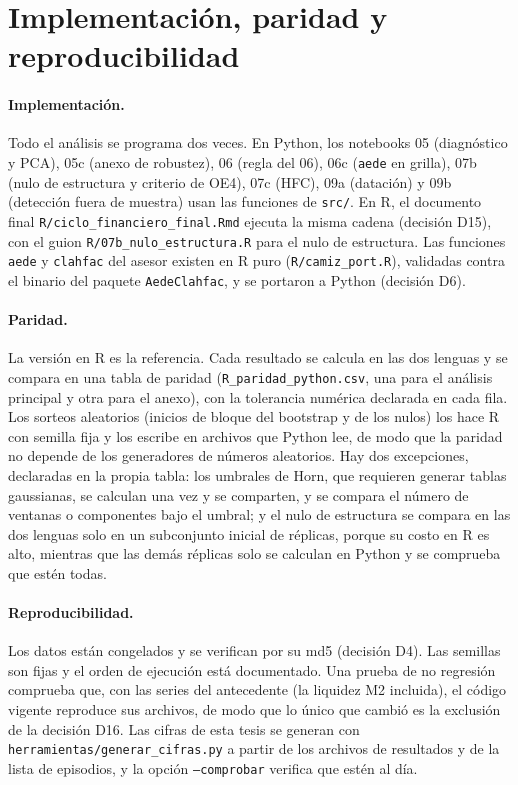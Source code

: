 \section{Implementación, paridad y reproducibilidad}
\label{sec:met-implementacion}

\paragraph{Implementación.} Todo el análisis se programa dos veces. En Python, los notebooks 05
(diagnóstico y PCA), 05c (anexo de robustez), 06 (regla del 06), 06c (\texttt{aede} en grilla),
07b (nulo de estructura y criterio de OE4), 07c (HFC), 09a (datación) y 09b (detección fuera de
muestra) usan las funciones de \texttt{src/}. En R, el documento final
\texttt{R/ciclo\_financiero\_final.Rmd} ejecuta la misma cadena (decisión D15), con el guion
\texttt{R/07b\_nulo\_estructura.R} para el nulo de estructura. Las funciones \texttt{aede} y
\texttt{clahfac} del asesor existen en R puro (\texttt{R/camiz\_port.R}), validadas contra el binario
del paquete \texttt{AedeClahfac}, y se portaron a Python (decisión D6).

\paragraph{Paridad.} La versión en R es la referencia. Cada resultado se calcula en las dos lenguas
y se compara en una tabla de paridad (\texttt{R\_paridad\_python.csv}, una para el análisis
principal y otra para el anexo), con la tolerancia numérica declarada en cada fila. Los sorteos
aleatorios (inicios de bloque del bootstrap y de los nulos) los hace R con semilla fija y los
escribe en archivos que Python lee, de modo que la paridad no depende de los generadores de números
aleatorios. Hay dos excepciones, declaradas en la propia tabla: los umbrales de Horn, que requieren
generar tablas gaussianas, se calculan una vez y se comparten, y se compara el número de ventanas o
componentes bajo el umbral; y el nulo de estructura se compara en las dos lenguas solo en un
subconjunto inicial de réplicas, porque su costo en R es alto, mientras que las demás réplicas solo
se calculan en Python y se comprueba que estén todas.

\paragraph{Reproducibilidad.} Los datos están congelados y se verifican por su md5 (decisión D4).
Las semillas son fijas y el orden de ejecución está documentado. Una prueba de no regresión
comprueba que, con las series del antecedente (la liquidez M2 incluida), el código vigente
reproduce sus archivos, de modo
que lo único que cambió es la exclusión de la decisión D16. Las cifras de esta tesis se generan con
\texttt{herramientas/generar\_cifras.py} a partir de los archivos de resultados y de la lista de
episodios, y la opción \texttt{--comprobar} verifica que estén al día.
